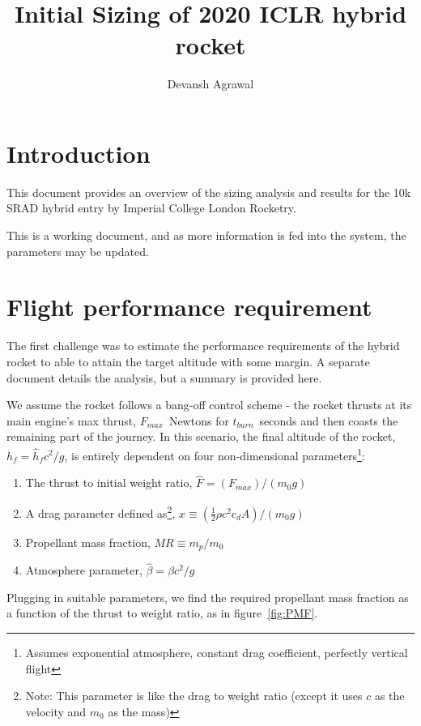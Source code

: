 \documentclass[12pt]{article}
\title{Initial Sizing of 2020 ICLR hybrid rocket}
\author{Devansh Agrawal}
\newcommand{\half}{\frac{1}{2}}
\begin{document}
\maketitle


\section{Introduction}

This document provides an overview of the sizing analysis and results for the 10k SRAD hybrid entry by Imperial College London Rocketry. 

This is a working document, and as more information is fed into the system, the parameters may be updated.

\section{Flight performance requirement}

The first challenge was to estimate the performance requirements of the hybrid rocket to able to attain the target altitude with some margin. A separate document details the analysis, but a summary is provided here. 

We assume the rocket follows a bang-off control scheme - the rocket thrusts at its main engine's max thrust, $F_{max}$~Newtons for $t_{burn}$~seconds and then coasts the remaining part of the journey. In this scenario, the final altitude of the rocket, $h_f = \hat h_f c^2/g$, is entirely dependent on four non-dimensional parameters\footnote{Assumes exponential atmosphere, constant drag coefficient, perfectly vertical flight}:


\begin{enumerate}
\item The thrust to initial weight ratio, $\hat F = (F_{max})/(m_0 g)$

\item A drag parameter defined as\footnote{Note: This parameter is like the drag to weight ratio (except it uses $c$ as the velocity and $m_0$ as the mass)}, $ x \equiv (\half \rho c^2 c_d A)/(m_0 g)$

\item Propellant mass fraction, $MR \equiv m_p/m_0$

\item Atmosphere parameter, $\hat \beta = \beta c^2/g$

\end{enumerate}

Plugging in suitable parameters, we find the required propellant mass fraction as a function of the thrust to weight ratio, as in figure~\ref{fig:PMF}. 
\end{document}
